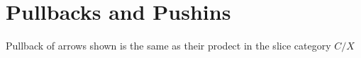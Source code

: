 \documentclass[../../notes.tex]{subfiles}
\begin{document}
\section{Pullbacks and Pushins}


Pullback of arrows shown is the same as their prodect in the slice category $C/X$
\end{document}
